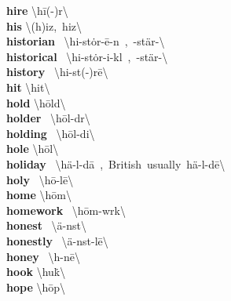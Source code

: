 \documentclass[10pt,a4paper]{article}
\begin{document}
\begin{multicols}{2}
\textbf{ hire }\quad \textbackslash \textprimstress h\={i}(-\textschwa )r\textbackslash \\
\textbf{ his }\quad \textbackslash (h)iz,\ \textsecstress hiz\textbackslash \\
\textbf{ historian }\quad \ \textbackslash hi-\textprimstress st\.{o}r-\={e}-\textschwa n\ ,\ -\textprimstress st\"{a}r-\textbackslash \\
\textbf{ historical }\quad \ \textbackslash hi-\textprimstress st\.{o}r-i-k\textschwa l\ ,\ -\textprimstress st\"{a}r-\textbackslash \\
\textbf{ history }\quad \ \textbackslash \textprimstress hi-st(\textschwa -)r\={e}\textbackslash \\
\textbf{ hit }\quad \textbackslash \textprimstress hit\textbackslash \\
\textbf{ hold }\quad \textbackslash \textprimstress h\={o}ld\textbackslash \\
\textbf{ holder }\quad \ \textbackslash \textprimstress h\={o}l-d\textschwa r\textbackslash \\
\textbf{ holding }\quad \ \textbackslash \textprimstress h\={o}l-di\engma \textbackslash \\
\textbf{ hole }\quad \textbackslash \textprimstress h\={o}l\textbackslash \\
\textbf{ holiday }\quad \ \textbackslash \textprimstress h\"{a}-l\textschwa -\textsecstress d\={a}\ ,\ British\ usually\ \textprimstress h\"{a}-l\textschwa -d\={e}\textbackslash \\
\textbf{ holy }\quad \ \textbackslash \textprimstress h\={o}-l\={e}\textbackslash \\
\textbf{ home }\quad \textbackslash \textprimstress h\={o}m\textbackslash \\
\textbf{ homework }\quad \ \textbackslash \textprimstress h\={o}m-\textsecstress w\textschwa rk\textbackslash \\
\textbf{ honest }\quad \ \textbackslash \textprimstress \"{a}-n\textschwa st\textbackslash \\
\textbf{ honestly }\quad \ \textbackslash \textprimstress \"{a}-n\textschwa st-l\={e}\textbackslash \\
\textbf{ honey }\quad \ \textbackslash \textprimstress h\textschwa -n\={e}\textbackslash \\
\textbf{ hook }\quad \textbackslash \textprimstress hu\. k\textbackslash \\
\textbf{ hope }\quad \textbackslash \textprimstress h\={o}p\textbackslash \\

\end{multicols}
\end{document}
